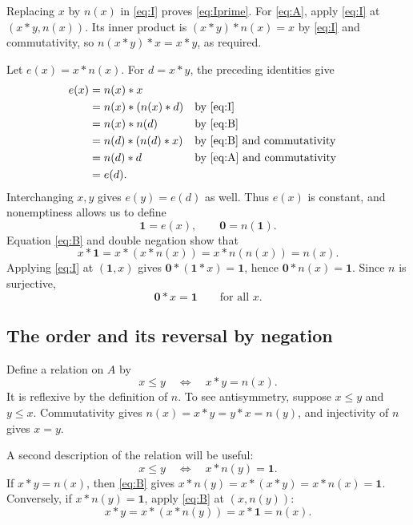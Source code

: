 \documentclass[11pt,a4paper]{article}
\newcommand{\one}{\mathbf{1}}
\newcommand{\zero}{\mathbf{0}}
\begin{document}
Replacing $x$ by $n(x)$ in \eqref{eq:I} proves \eqref{eq:Iprime}.
For \eqref{eq:A}, apply \eqref{eq:I} at $(x*y,n(x))$. Its inner
product is $(x*y)*n(x)=x$ by \eqref{eq:I} and commutativity, so
$n(x*y)*x=x*y$, as required.

Let $e(x)=x*n(x)$. For $d=x*y$, the preceding identities give
\[
 \begin{aligned}
 e(x)&=n(x)*x\\
     &=n(x)*(n(x)*d) &&\text{by \eqref{eq:I}}\\
     &=n(x)*n(d) &&\text{by \eqref{eq:B}}\\
     &=n(d)*(n(d)*x) &&\text{by \eqref{eq:B} and commutativity}\\
     &=n(d)*d &&\text{by \eqref{eq:A} and commutativity}\\
     &=e(d).
 \end{aligned}
\]
Interchanging $x,y$ gives $e(y)=e(d)$ as well. Thus $e(x)$ is constant,
and nonemptiness allows us to define
\[
 \one=e(x),\qquad \zero=n(\one).
\]
Equation \eqref{eq:B} and double negation show that
\begin{equation}
 x*\one=x*(x*n(x))=x*n(n(x))=n(x).\label{eq:one}
\end{equation}
Applying \eqref{eq:I} at $(\one,x)$ gives
$\zero*(\one*x)=\one$, hence $\zero*n(x)=\one$.
Since $n$ is surjective,
\begin{equation}
 \zero*x=\one\qquad\text{for all }x.\label{eq:zero}
\end{equation}

\subsection{The order and its reversal by negation}
Define a relation on $A$ by
\begin{equation}
 x\leq y\quad\Longleftrightarrow\quad x*y=n(x).\label{eq:order}
\end{equation}
It is reflexive by the definition of $n$. To see antisymmetry, suppose
$x\leq y$ and $y\leq x$. Commutativity gives $n(x)=x*y=y*x=n(y)$,
and injectivity of $n$ gives $x=y$.

A second description of the relation will be useful:
\begin{equation}
 x\leq y\quad\Longleftrightarrow\quad x*n(y)=\one.\label{eq:orderone}
\end{equation}
If $x*y=n(x)$, then \eqref{eq:B} gives
$x*n(y)=x*(x*y)=x*n(x)=\one$.
Conversely, if $x*n(y)=\one$, apply \eqref{eq:B} at $(x,n(y))$:
\[
 x*y=x*(x*n(y))=x*\one=n(x).
\]
\end{document}

